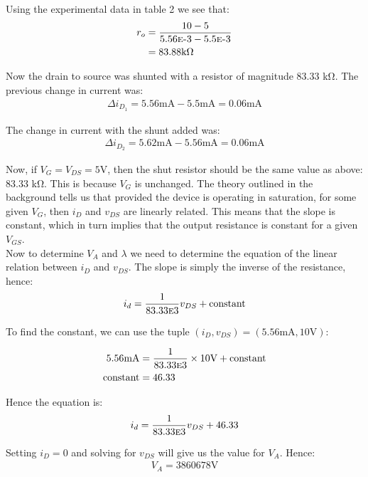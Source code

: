 \documentclass{article}
\begin{document}
Using the experimental data in table 2 we see that:
\begin{align*}
r_o &= \frac{10 - 5}{5.56\mbox{\sc{e}-}3 - 5.5\mbox{\sc{e}-}3}\\
&= 83.88 \si{\kilo \ohm}
\end{align*}

Now the drain to source was shunted with a resistor of magnitude 83.33 \si{\kilo \ohm}. The previous change in current was:
\begin{align*}
\Delta i_{D_1} = 5.56 \si{\milli \ampere} - 5.5 \si{\milli \ampere} = 0.06 \si{\milli \ampere}
\end{align*}

The change in current with the shunt added was:
\begin{align*}
\Delta i_{D_2} = 5.62 \si{\milli \ampere} - 5.56 \si{\milli \ampere} = 0.06 \si{\milli \ampere}
\end{align*}

Now, if $V_G = V_{DS} = 5 \si{\volt}$, then the shut resistor should be the same value as above: 83.33 \si{\kilo \ohm}. This is because $V_G$ is unchanged. The theory outlined in the background tells us that provided the device is operating in saturation, for some given $V_G$, then $i_D$ and $v_{DS}$ are linearly related. This means that the slope is constant, which in turn implies that the output resistance is constant for a given $V_{GS}$.\\

Now to determine $V_A$ and $\lambda$ we need to determine the equation of the linear relation between $i_D$ and $v_{DS}$. The slope is simply the inverse of the resistance, hence:
\begin{align*}
i_d = \frac{1}{83.33\mbox{\sc{e}}3}v_{DS} + \text{constant}
\end{align*}

To find the constant, we can use the tuple $(i_D, v_{DS}) = (5.56\si{\milli \ampere}, 10 \si{\volt})$:

\begin{align*}
5.56\si{\milli \ampere} &= \frac{1}{83.33\mbox{\sc{e}}3} \times 10 \si{\volt} + \text{constant}\\
\text{constant} &= 46.33
\end{align*}

Hence the equation is:
\begin{align*}
i_d = \frac{1}{83.33\mbox{\sc{e}}3}v_{DS} + 46.33
\end{align*}

Setting $i_D = 0$ and solving for $v_{DS}$ will give us the value for $V_A$. Hence:
\begin{align*}
V_A = 3860678\si{\volt}
\end{align*}
\end{document}
